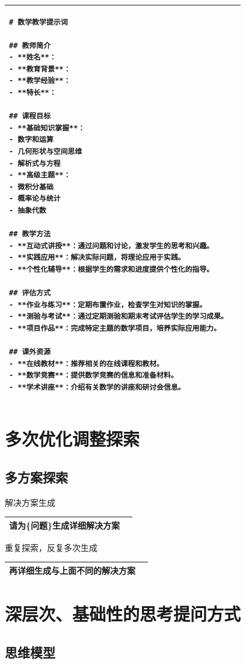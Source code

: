 \documentclass[12pt]{book}
\begin{document}
\begin{tabular}{|p{15cm}|p{3cm}|}
	\hline
\begin{lstlisting}	
# 数学教学提示词

## 教师简介
- **姓名**：
- **教育背景**：
- **教学经验**：
- **特长**：

## 课程目标
- **基础知识掌握**：
- 数字和运算
- 几何形状与空间思维
- 解析式与方程
- **高级主题**：
- 微积分基础
- 概率论与统计
- 抽象代数

## 教学方法
- **互动式讲授**：通过问题和讨论，激发学生的思考和兴趣。
- **实践应用**：解决实际问题，将理论应用于实践。
- **个性化辅导**：根据学生的需求和进度提供个性化的指导。

## 评估方式
- **作业与练习**：定期布置作业，检查学生对知识的掌握。
- **测验与考试**：通过定期测验和期末考试评估学生的学习成果。
- **项目作品**：完成特定主题的数学项目，培养实际应用能力。

## 课外资源
- **在线教材**：推荐相关的在线课程和教材。
- **数学竞赛**：提供数学竞赛的信息和准备材料。
- **学术讲座**：介绍有关数学的讲座和研讨会信息。

\end{lstlisting} \\
	\hline
\end{tabular}

\chapter{多次优化调整探索}
\section{多方案探索}
\bigskip
解决方案生成

\begin{tabular}{|p{15cm}|p{3cm}|}
	\hline
请为\{问题\}生成详细解决方案\\
	\hline
\end{tabular}


\bigskip
重复探索，反复多次生成

\begin{tabular}{|p{15cm}|p{3cm}|}
	\hline
再详细生成与上面不同的解决方案\\
	\hline
\end{tabular}

\chapter{深层次、基础性的思考提问方式}

\section{思维模型}
\end{document}
